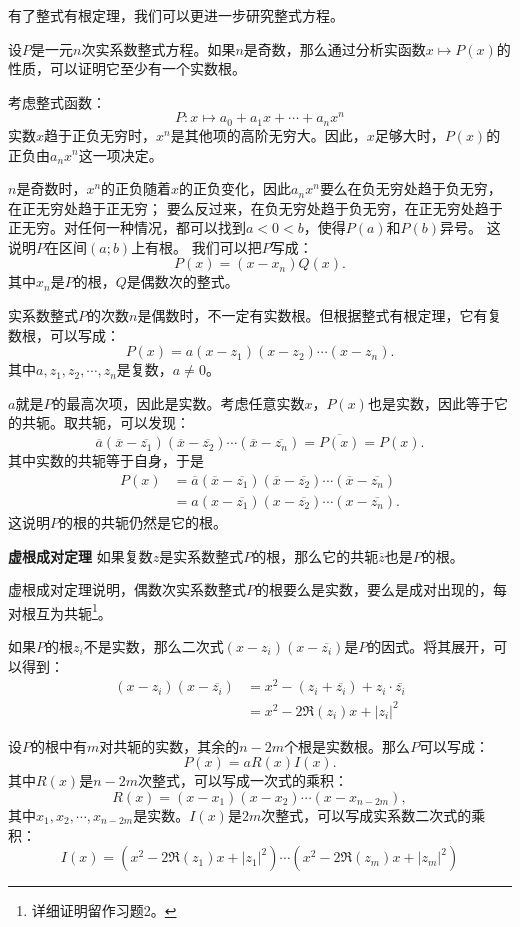 \documentclass[12pt,UTF8,fontset=none]{ctexbook}
\begin{document}
\begin{appendix}
有了整式有根定理，我们可以更进一步研究整式方程。

设$P$是一元$n$次实系数整式方程。如果$n$是奇数，那么通过分析实函数$x\mapsto P(x)$的性质，可以证明它至少有一个实数根。

考虑整式函数：
$$P: x\mapsto a_0 + a_1 x + \cdots + a_n x^n$$
实数$x$趋于正负无穷时，$x^n$是其他项的高阶无穷大。因此，$x$足够大时，$P(x)$的正负由$a_nx^n$这一项决定。

$n$是奇数时，$x^n$的正负随着$x$的正负变化，因此$a_nx^n$要么在负无穷处趋于负无穷，在正无穷处趋于正无穷；
要么反过来，在负无穷处趋于负无穷，在正无穷处趋于正无穷。对任何一种情况，都可以找到$a<0<b$，使得$P(a)$和$P(b)$异号。
这说明$P$在区间$(a;b)$上有根。
我们可以把$P$写成：
$$ P(x) = (x - x_n)Q(x).$$
其中$x_n$是$P$的根，$Q$是偶数次的整式。

实系数整式$P$的次数$n$是偶数时，不一定有实数根。但根据整式有根定理，它有复数根，可以写成：
$$ P(x) = a(x - z_1)(x - z_2)\cdots(x - z_n).$$
其中$a, z_1, z_2,\cdots, z_n$是复数，$a\neq 0$。

$a$就是$P$的最高次项，因此是实数。考虑任意实数$x$，$P(x)$也是实数，因此等于它的共轭。取共轭，可以发现：
$$ \overline{a}(\overline{x} - \overline{z_1})(\overline{x} - \overline{z_2})\cdots(\overline{x} - \overline{z_n}) = \overline{P(x)} = P(x).$$
其中实数的共轭等于自身，于是
\begin{align*}
    P(x) &= \overline{a}(\overline{x} - \overline{z_1})(\overline{x} - \overline{z_2})\cdots(\overline{x} - \overline{z_n}) \\
    &= a(x - \overline{z_1})(x - \overline{z_2})\cdots(x - \overline{z_n}). 
\end{align*}
这说明$P$的根的共轭仍然是它的根。
\begin{tm}{\textbf{虚根成对定理}}
    如果复数$z$是实系数整式$P$的根，那么它的共轭$\overline{z}$也是$P$的根。
\end{tm}
虚根成对定理说明，偶数次实系数整式$P$的根要么是实数，要么是成对出现的，每对根互为共轭\footnote{详细证明留作习题2。}。
  
如果$P$的根$z_i$不是实数，那么二次式$(x - z_i)(x - \overline{z_i})$是$P$的因式。将其展开，可以得到：
\begin{align*}
    (x - z_i)(x - \overline{z_i}) &= x^2 - (z_i + \overline{z_i}) + z_i\cdot\overline{z_i} \\
    &= x^2 - 2\Re(z_i)x + |z_i|^2
\end{align*}

设$P$的根中有$m$对共轭的实数，其余的$n-2m$个根是实数根。那么$P$可以写成：
$$ P(x) = aR(x)I(x).$$
其中$R(x)$是$n-2m$次整式，可以写成一次式的乘积：
$$ R(x) = (x - x_1)(x - x_2)\cdots(x - x_{n-2m}), $$
其中$x_1, x_2, \cdots, x_{n-2m}$是实数。$I(x)$是$2m$次整式，可以写成实系数二次式的乘积：
$$ I(x) = (x^2 - 2\Re(z_1)x + |z_1|^2) \cdots (x^2 - 2\Re(z_m)x + |z_m|^2)$$


\end{appendix}
\end{document}
